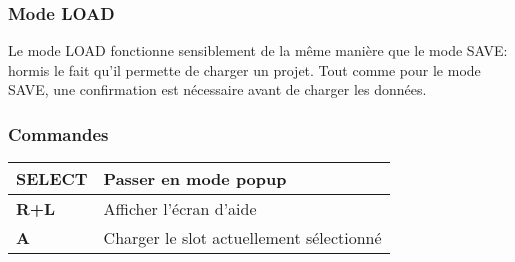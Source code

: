 \subsubsection{Mode LOAD}

Le mode LOAD fonctionne sensiblement de la même manière que le mode SAVE: hormis le fait qu'il permette de charger un projet.
Tout comme pour le mode SAVE, une confirmation est nécessaire avant de charger les données.


\subsubsection{Commandes}
\tablelasttail{\hline}
\begin{supertabular}{|l|p{11cm}|}
\hline
    {\bf SELECT} & Passer en mode popup \\
    \hline
    {\bf R+L} & Afficher l'écran d'aide \\
    \hline
    {\bf A} & Charger le slot actuellement sélectionné \\
\hline
\end{supertabular}

